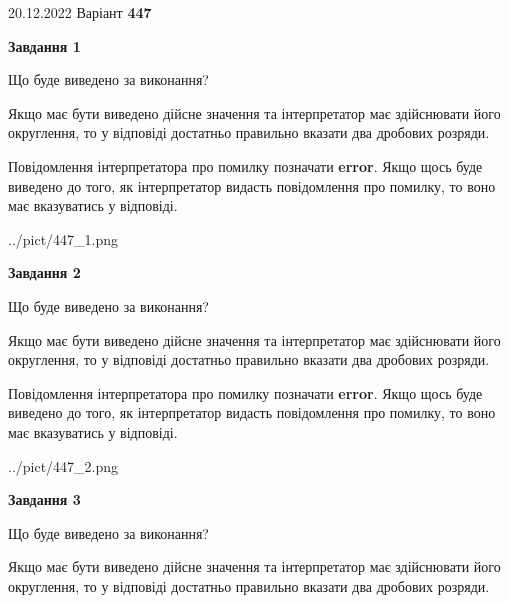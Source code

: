 \documentclass[12pt, ukrainian]{article}
\begin{document}
{20.12.2022 Варіант \No \textbf { 447 }\par}
{
\begin {Large}

{\begin {center}\textbf{Завдання 1}\end {center}}\par
Що буде виведено за виконання? \par

Якщо має бути виведено дійсне значення та інтерпретатор має здійснювати його округлення, 
то у відповіді достатньо правильно вказати два дробових розряди.

Повідомлення інтерпретатора про помилку позначати \textbf{error}.
Якщо щось буде виведено до того, як інтерпретатор видасть повідомлення про помилку, 
то воно має вказуватись у відповіді. \par

\begin{center}
	{../pict/447_1.png}
\end{center}
\newpage

{\begin {center}\textbf{Завдання 2}\end {center}}\par
Що буде виведено за виконання? \par

Якщо має бути виведено дійсне значення та інтерпретатор має здійснювати його округлення, 
то у відповіді достатньо правильно вказати два дробових розряди.

Повідомлення інтерпретатора про помилку позначати \textbf{error}.
Якщо щось буде виведено до того, як інтерпретатор видасть повідомлення про помилку, 
то воно має вказуватись у відповіді. \par

\begin{center}
	{../pict/447_2.png}
\end{center}
\newpage

{\begin {center}\textbf{Завдання 3}\end {center}}\par
Що буде виведено за виконання? \par

Якщо має бути виведено дійсне значення та інтерпретатор має здійснювати його округлення, 
то у відповіді достатньо правильно вказати два дробових розряди.


\end{Large}}
\end{document}
